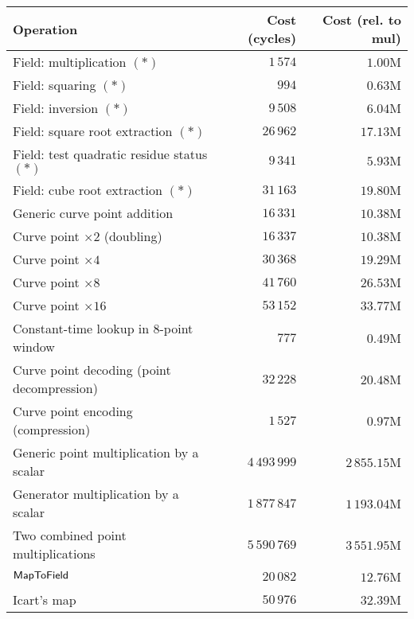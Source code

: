 \documentclass{llncs}
\begin{document}
\begin{table}[H]
\begin{center}
    \begin{tabular}{|l|r|r|}
    \hline
    \textsf{\textbf{Operation}} & \textsf{\textbf{Cost (cycles)}}
        & \textsf{\textbf{Cost (rel. to mul)}} \\
    \hline
Field: multiplication $(*)$                   &      $1\,574$ &      $1.00$M \\
Field: squaring $(*)$                         &         $994$ &      $0.63$M \\
Field: inversion $(*)$                        &      $9\,508$ &      $6.04$M \\
Field: square root extraction $(*)$           &     $26\,962$ &     $17.13$M \\
Field: test quadratic residue status $(*)$    &      $9\,341$ &      $5.93$M \\
Field: cube root extraction $(*)$             &     $31\,163$ &     $19.80$M \\
    \hline
Generic curve point addition                  &     $16\,331$ &     $10.38$M \\
Curve point $\times 2$ (doubling)             &     $16\,337$ &     $10.38$M \\
Curve point $\times 4$                        &     $30\,368$ &     $19.29$M \\
Curve point $\times 8$                        &     $41\,760$ &     $26.53$M \\
Curve point $\times 16$                       &     $53\,152$ &     $33.77$M \\
Constant-time lookup in 8-point window        &         $777$ &      $0.49$M \\
Curve point decoding (point decompression)    &     $32\,228$ &     $20.48$M \\
Curve point encoding (compression)            &      $1\,527$ &      $0.97$M \\
    \hline
Generic point multiplication by a scalar      & $4\,493\,999$ & $2\,855.15$M \\
Generator multiplication by a scalar          & $1\,877\,847$ & $1\,193.04$M \\
Two combined point multiplications            & $5\,590\,769$ & $3\,551.95$M \\
    \hline
$\text{\textsf{MapToField}}$                  &     $20\,082$ &     $12.76$M \\
Icart's map                                   &     $50\,976$ &     $32.39$M \\

\end{tabular}
\end{center}
\end{table}
\end{document}

